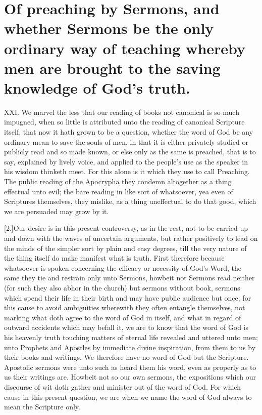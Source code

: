\section*{Of preaching by Sermons, and whether Sermons be the only ordinary way of teaching whereby men are brought to the saving knowledge of God’s truth.}
XXI. We marvel the less that our reading of books not canonical is so much impugned, when so little is attributed unto the reading of canonical Scripture itself, that now it hath grown to be a question, whether the word of God be any ordinary mean to save the souls of men,
 in that it is either privately studied or publicly read and so made known, or else only as the same is preached, that is to say, explained by lively voice, and applied to the people’s use as the speaker in his wisdom thinketh meet. For this alone is it which they use to call Preaching. The public reading of the Apocrypha they condemn altogether as a thing effectual unto evil; the bare reading in like sort of whatsoever, yea even of Scriptures themselves, they mislike, as a thing uneffectual to do that good, which we are persuaded may grow by it.

[2.]Our desire is in this present controversy, as in the rest, not to be carried up and down with the waves of uncertain arguments, but rather positively to lead on the minds of the simpler sort by plain and easy degrees, till the very nature of the thing itself do make manifest what is truth. First therefore because whatsoever is spoken concerning the efficacy or necessity of God’s Word, the same they tie and restrain only unto Sermons, howbeit not Sermons read neither (for such they also abhor in the church) but sermons without book, sermons which spend their life in their birth and may have public audience but once; for this cause to avoid ambiguities wherewith they often entangle themselves, not marking what doth agree to the word of God in itself, and what in regard of  outward accidents which may befall it,
 we are to know that the word of God is his heavenly truth touching matters of eternal life revealed and uttered unto men; unto Prophets and Apostles by immediate divine inspiration, from them to us by their books and writings. We therefore have no word of God but the Scripture. Apostolic sermons were unto such as heard them his word, even as properly as to us their writings are. Howbeit not so our own sermons, the expositions which our discourse of wit doth gather and minister out of the word of God. For which cause in this present question, we are when we name the word of God always to mean the Scripture only.

